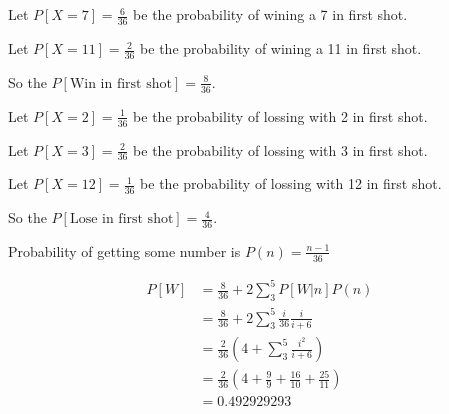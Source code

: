 \documentclass[12pt, a4paper]{article}
\begin{document}
\section{}
Let $P[X=7] = \frac{6}{36}$ be the probability of wining a 7 in first shot.

Let $P[X=11] = \frac{2}{36}$ be the probability of wining a 11 in first shot.

So the $P[\text{Win in first shot}] = \frac{8}{36}$.

Let $P[X=2] = \frac{1}{36}$ be the probability of lossing with 2 in first shot.

Let $P[X=3] = \frac{2}{36}$ be the probability of lossing with 3 in first shot.

Let $P[X=12] = \frac{1}{36}$ be the probability of lossing with 12 in first shot.

So the $P[\text{Lose in first shot}] = \frac{4}{36}$.

Probability of getting some number is $P(n) = \frac{n-1}{36}$

\begin{subequations}
  \begin{align}
    P[W] &= \frac{8}{36} + 2 \sum_3^5 P[W|n]P(n)\\
         &= \frac{8}{36} + 2 \sum_3^5 \frac{i}{36}\frac{i}{i+6}\\
         &= \frac{2}{36} (4+\sum_3^5\frac{i^2}{i+6})\\
         &= \frac{2}{36} (4+\frac{9}{9}+\frac{16}{10}+\frac{25}{11})\\
         &= 0.492929293
  \end{align}
\end{subequations}
\end{document}
